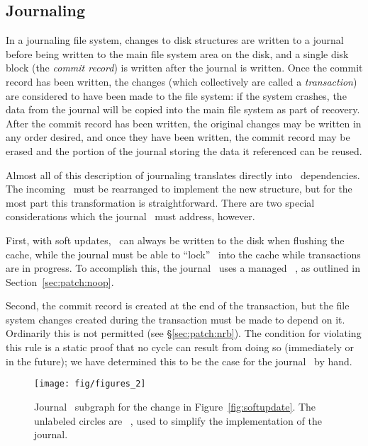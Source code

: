 \subsection{Journaling}
\label{sec:using:journal}

In a journaling file system, changes to disk structures are written to a journal
before being written to the main file system area on the disk, and a single disk
block (the \emph{commit record}) is written after the journal is written. Once
the commit record has been written, the changes (which collectively are called a
\emph{transaction}) are considered to have been made to the file system: if the
system crashes, the data from the journal will be copied into the main file
system as part of recovery. After the commit record has been written, the
original changes may be written in any order desired, and once they have been
written, the commit record may be erased and the portion of the journal storing
the data it referenced can be reused.

Almost all of this description of journaling translates directly into \chdesc\
dependencies. The incoming \chdescs\ must be rearranged to implement the new
structure, but for the most part this transformation is straightforward. There
are two special considerations which the journal \module\ must address, however.

First, with soft updates, \chdescs\ can always be written to the disk when
flushing the cache, while the journal must be able to ``lock'' \chdescs\ into
the cache while transactions are in progress. To accomplish this, the journal
\module\ uses a managed \noop\ \chdesc, as outlined in
Section~\ref{sec:patch:noop}.

Second, the commit record is created at the end of the transaction, but the file
system changes created during the transaction must be made to depend on it.
Ordinarily this is not permitted (see \S\ref{sec:patch:nrb}). The condition for
violating this rule is a static proof that no cycle can result from doing so
(immediately or in the future); we have determined this to be the case for the
journal \module\ by hand.

\begin{figure}
  \centering
  \texttt{[image: fig/figures\_2]}
  \caption{\label{fig:journal} Journal \chdesc\ subgraph for the
    change in Figure~\ref{fig:softupdate}. The unlabeled circles are
    \noop\ \chdescs, used to simplify the implementation of the journal.}
\end{figure}

